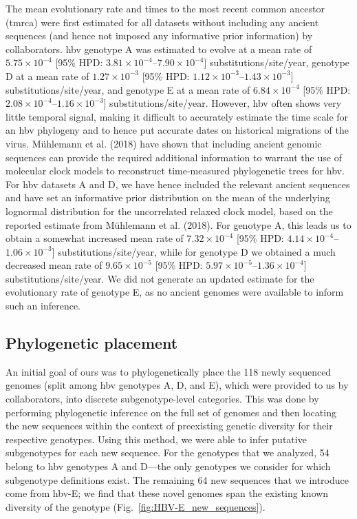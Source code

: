 The mean evolutionary rate and times to the most recent common ancestor (\gls{tmrca}) were first estimated for all datasets without including any ancient sequences (and hence not imposed any informative prior information) by collaborators.
\gls{hbv} genotype A was estimated to evolve at a mean rate of $5.75\times10^{-4}$ [95\% HPD: $3.81\times10^{-4}$--$7.90\times10^{-4}$] substitutions/site/year, genotype D at a mean rate of $1.27\times10^{-3}$ [95\% HPD: $1.12\times10^{-3}$--$1.43\times10^{-3}$] substitutions/site/year, and genotype E at a mean rate of $6.84\times10^{-4}$ [95\% HPD: $2.08\times10^{-4}$--$1.16\times10^{-3}$] substitutions/site/year.
However, \gls{hbv} often shows very little temporal signal, making it difficult to accurately estimate the time scale for an \gls{hbv} phylogeny and to hence put accurate dates on historical migrations of the virus.
M{\"u}hlemann et al. (2018) have shown that including ancient genomic sequences can provide the required additional information to warrant the use of molecular clock models to reconstruct time-measured phylogenetic trees for \gls{hbv}.
For \gls{hbv} datasets A and D, we have hence included the relevant ancient sequences and have set an informative prior distribution on the mean of the underlying lognormal distribution for the uncorrelated relaxed clock model, based on the reported estimate from M{\"u}hlemann et al. (2018).
For genotype A, this leads us to obtain a somewhat increased mean rate of $7.32\times10^{-4}$ [95\% HPD: $4.14\times10^{-4}$--$1.06\times10^{-3}$] substitutions/site/year, while for genotype D we obtained a much decreased mean rate of $9.65\times10^{-5}$ [95\% HPD: $5.97\times10^{-5}$--$1.36\times10^{-4}$] substitutions/site/year.
We did not generate an updated estimate for the evolutionary rate of genotype E, as no ancient genomes were available to inform such an inference.
\subsection{Phylogenetic placement}

An initial goal of ours was to phylogenetically place the 118 newly sequenced genomes (split among \gls{hbv} genotypes A, D, and E), which were provided to us by collaborators, into discrete subgenotype-level categories.
This was done by performing phylogenetic inference on the full set of genomes and then locating the new sequences within the context of preexisting genetic diversity for their respective genotypes.
Using this method, we were able to infer putative subgenotypes for each new sequence.
For the genotypes that we analyzed, 54 belong to \gls{hbv} genotypes A and D---the only genotypes we consider for which subgenotype definitions exist.
The remaining 64 new sequences that we introduce come from \gls{hbv}-E; we find that these novel genomes span the existing known diversity of the genotype (Fig.~\ref{fig:HBV-E_new_sequences}).

